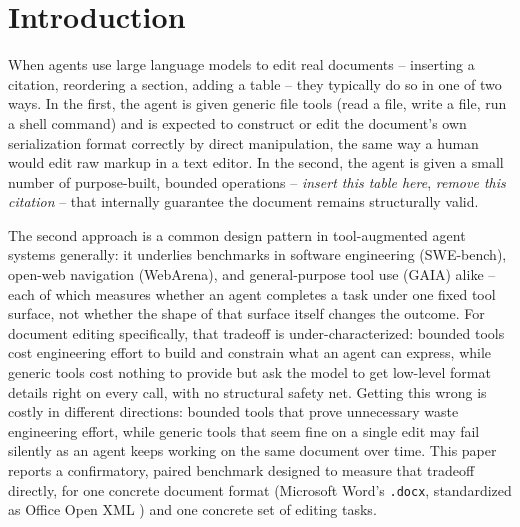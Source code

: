 \documentclass[11pt]{article}
\DeclareRobustCommand{\claim}[2]{#2}
\begin{document}
\begin{abstract}
{observations, the two arms differ by  percentage points ($p<\val{respec.anchorset.p_bound}$),}
\claim{checkpoint-b-central-test}{and on the design's own central test -- whether unrelated, already-correct content survives a
mid-chain reversal of a different requirement untouched} -- \claim{checkpoint-b-leak-p0305}{the generic tool's raw edits leak into
untouched content while the bounded tool's never do ($p=\val{respec.keepsurvival.anchorset.p}$).} \claim{defects-all-fixed-status}{\claim{ten-defects-count}{Separately, we
document ten
infrastructure and evaluation-harness defects that this benchmark's own development surfaced,
nine of them fixed}} -- \claim{defects-materially-changed-numbers}{several of which materially changed the reported numbers} -- \claim{defects-disclosed-in-full}{disclosed in full rather
than silently corrected.}
\end{abstract}

\section{Introduction}
\label{sec:intro}

When agents use large language models to edit real documents -- inserting a citation, reordering
a section, adding a table -- they typically do so in one of two ways. In the first, the agent is
given generic file tools (read a file, write a file, run a shell command) and is expected to
construct or edit the document's own serialization format correctly by direct manipulation, the
same way a human would edit raw markup in a text editor. In the second, the agent is given a
small number of purpose-built, bounded operations -- \emph{insert this table here},
\emph{remove this citation} -- that internally guarantee the document remains structurally
valid.

The second approach is a common design pattern in tool-augmented agent systems generally: it
underlies benchmarks in software engineering (SWE-bench), open-web navigation (WebArena), and
general-purpose tool use (GAIA) alike \citep{jimenez2023swebench,zhou2024webarena,mialon2023gaia}
-- \claim{prior-benchmarks-fixed-tool-surface}{each of which measures whether an agent completes a task under one fixed tool surface, not
whether the shape of that surface itself changes the outcome.} \claim{novelty-word-ooxml}{For document editing specifically,
that tradeoff is under-characterized:} bounded tools cost engineering effort to build and
constrain what an agent can express, while generic tools cost nothing to provide but ask the
model to get low-level format details right on every call, with no structural safety net.
Getting this wrong is costly in different directions: bounded tools that prove unnecessary waste
engineering effort, while generic tools that seem fine on a single edit may fail silently as an
agent keeps working on the same document over time. This paper reports a confirmatory, paired
benchmark designed to measure that tradeoff directly, for one concrete document format
(Microsoft Word's \texttt{.docx}, standardized as Office Open XML \citep{ecma376}) and one
concrete set of editing tasks.
\end{document}
